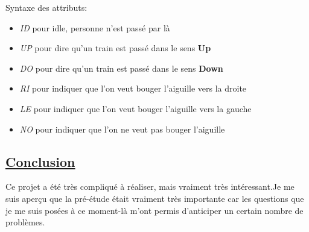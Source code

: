 \medskip

Syntaxe des attributs:

\begin{itemize}
  \item \emph{ID} pour idle, personne n'est passé par là
  \item \emph{UP} pour dire qu'un train est passé dans le sens \textbf{Up}
  \item \emph{DO} pour dire qu'un train est passé dans le sens \textbf{Down}    
  \item \emph{RI} pour indiquer que l'on veut bouger l'aiguille vers la
    droite
  \item \emph{LE} pour indiquer que l'on veut bouger l'aiguille vers la
    gauche
  \item \emph{NO} pour indiquer que l'on ne veut pas bouger l'aiguille       
\end{itemize}

\newpage

\subsection{\underline{Conclusion}}
\label{sec:Conclusion}

Ce projet a été très compliqué à réaliser, mais vraiment très intéressant.Je me suis aperçu que la pré-étude était vraiment très importante car les questions que je me suis posées à ce moment-là m'ont permis d'anticiper un certain nombre de problèmes.



\newpage





